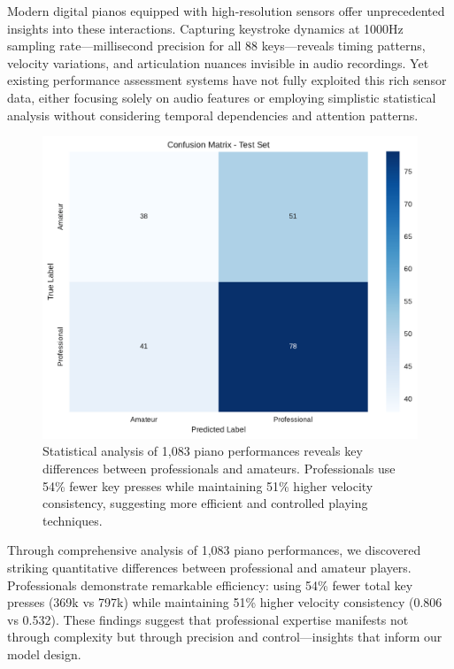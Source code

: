 \documentclass[sigconf,review,anonymous]{acmart}
\begin{document}
Modern digital pianos equipped with high-resolution sensors offer unprecedented insights into these interactions.
Capturing keystroke dynamics at 1000Hz sampling rate—millisecond precision for all 88 keys—reveals timing patterns, velocity variations, and articulation nuances invisible in audio recordings.
Yet existing performance assessment systems have not fully exploited this rich sensor data, either focusing solely on audio features or employing simplistic statistical analysis without considering temporal dependencies and attention patterns.

\begin{figure}[h]
  \centering
  \includegraphics[width=\linewidth]{figures/confusion_matrix.pdf}
  \caption{Statistical analysis of 1,083 piano performances reveals key differences between professionals and amateurs. 
  Professionals use 54\% fewer key presses while maintaining 51\% higher velocity consistency, suggesting more efficient and controlled playing techniques.}
  \Description{}
  \label{fig:performance_comparison}
\end{figure}

Through comprehensive analysis of 1,083 piano performances, we discovered striking quantitative differences between professional and amateur players.
Professionals demonstrate remarkable efficiency: using 54\% fewer total key presses (369k vs 797k) while maintaining 51\% higher velocity consistency (0.806 vs 0.532).
These findings suggest that professional expertise manifests not through complexity but through precision and control—insights that inform our model design.
\end{document}
